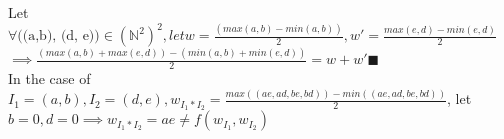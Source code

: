 \documentclass{article}
\begin{document}
\noindent Let $ \forall \text{((a,b), (d, e))} \in (\mathbb{N}^2)^2, let w = \frac{(max(a,b) - min(a,b))}{2}, w' = \frac{max(e, d) - min(e,d)}{2}$\\
$ \implies \frac{(max(a, b) + max(e,d)) - (min(a,b) + min(e,d))}{2}  = w + w' \blacksquare$\\

In the case of $ I_1 = (a,b) , I_2 = (d, e), w_{I_1 * I_2}  =  \frac{max((ae, ad, be, bd)) - min((ae, ad, be, bd))}{2}  $, let $ b = 0 , d = 0 \implies w_{I_1*I_2}  = ae \neq f( w_{I_1} , w_{I_2})$
\end{document}
